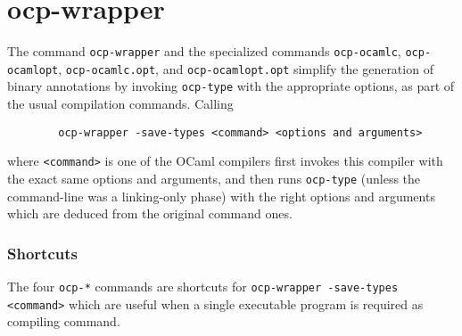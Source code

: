 
\section{ocp-wrapper}

The command \verb!ocp-wrapper! and the specialized commands
\verb!ocp-ocamlc!, \verb!ocp-ocamlopt!, \verb!ocp-ocamlc.opt!, and
\verb!ocp-ocamlopt.opt! simplify the generation of binary annotations
by invoking \verb!ocp-type! with the appropriate options, as part of
the usual compilation commands. Calling
{\verbsize \begin{verbatim}
        ocp-wrapper -save-types <command> <options and arguments>
\end{verbatim}}
\noindent where \verb!<command>! is one of the OCaml compilers first
invokes this compiler with the exact same options and arguments, and
then runs \verb!ocp-type! (unless the command-line was a linking-only
phase) with the right options and arguments which are deduced from the
original command ones.

\subsubsection*{Shortcuts}

The four \verb!ocp-*! commands are shortcuts for
\verb!ocp-wrapper -save-types <command>! which are useful when a
single executable program is required as compiling command.

